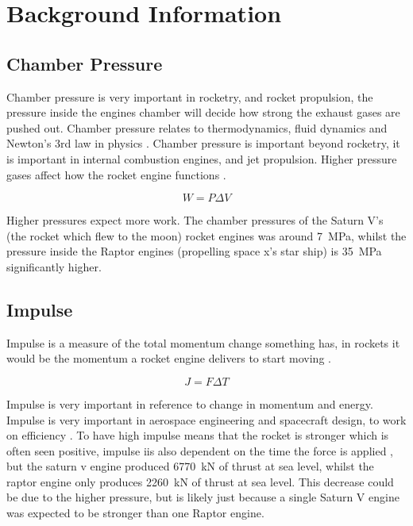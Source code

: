\documentclass[12pt,a4paper]{article}
\begin{document}
\section{Background Information}

\subsection{Chamber Pressure}

Chamber pressure is very important in rocketry, and rocket propulsion, the pressure inside the engines chamber will decide how strong the exhaust gases are pushed out. Chamber pressure relates to thermodynamics, fluid dynamics and Newton's 3rd law in physics \cite{ref2}. Chamber pressure is important beyond rocketry, it is important in internal combustion engines, and jet propulsion. Higher pressure gases affect how the rocket engine functions \cite{ref1}. 

\begin{equation}
W = P\Delta V
\end{equation}

Higher pressures expect more work. The chamber pressures of the Saturn V's (the rocket which flew to the moon) rocket engines was around \SI{7}{\mega\pascal}, whilst the pressure inside the Raptor engines (propelling space x's star ship) is \SI{35}{\mega\pascal} significantly higher.

\subsection{Impulse}

Impulse is a measure of the total momentum change something has, in rockets it would be the momentum a rocket engine delivers to start moving \cite{ref5}. 

\begin{equation}
J = F\Delta T
\end{equation}

Impulse is very important in reference to change in momentum and energy. Impulse is very important in aerospace engineering and spacecraft design, to work on efficiency \cite{ref3}. To have high impulse means that the rocket is stronger which is often seen positive, impulse iis also dependent on the time the force is applied \cite{ref4}, but the saturn v engine produced \SI{6770}{\kilo\newton} of thrust at sea level, whilst the raptor engine only produces \SI{2260}{\kilo\newton} of thrust at sea level. This decrease could be due to the higher pressure, but is likely just because a single Saturn V engine was expected to be stronger than one Raptor engine.
\end{document}
